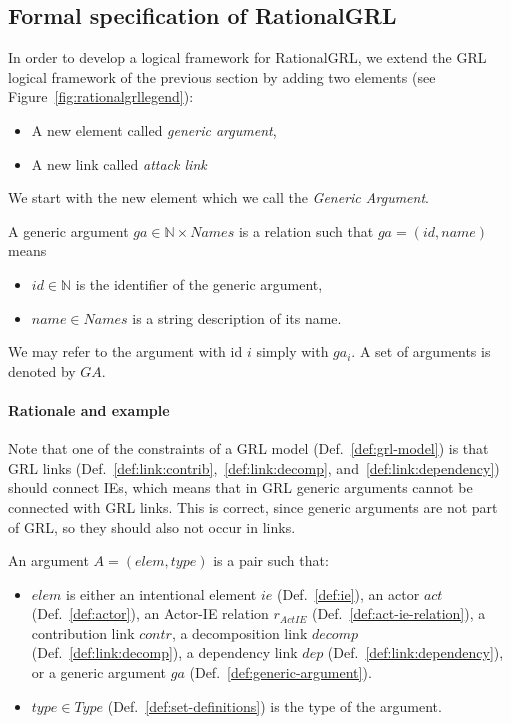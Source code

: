 \subsection{Formal specification of RationalGRL}
\label{sect:formalframework:rationalgrl}

In order to develop a logical framework for RationalGRL, we extend the GRL logical framework of the previous section by adding two elements (see Figure~\ref{fig:rationalgrllegend}):
\begin{itemize}
\item A new element called \emph{generic argument},
\item A new link called \emph{attack link}
\end{itemize}

We start with the new element which we call the \emph{Generic Argument}.

\begin{definition}
\label{def:generic-argument}
A generic argument $ga \in \mathbb{N}\times Names$ is a relation such that $ga=(id, name)$ means
\begin{itemize}
\item $id\in \mathbb{N}$ is the identifier of the generic argument,
\item $name\in Names$ is a string description of its name.
\end{itemize}
We may refer to the argument with id $i$ simply with $ga_i$. A set of arguments is denoted by $GA$.
\end{definition}

\paragraph{Rationale and example} 


Note that one of the constraints of a GRL model (Def.~\ref{def:grl-model}) is that GRL links (Def.~\ref{def:link:contrib},~\ref{def:link:decomp}, and~\ref{def:link:dependency}) should connect IEs, which means that in GRL generic arguments cannot be connected with GRL links. This is correct, since generic arguments are not part of GRL, so they should also not occur in links. 

\begin{definition}[Argument]
\label{def:argument}
An argument $A=(elem,type)$ is a pair such that:
\begin{itemize}
\item $elem$ is either an intentional element $ie$ (Def.~\ref{def:ie}), an actor $act$ (Def.~\ref{def:actor}), an Actor-IE relation $r_{ActIE}$ (Def.~\ref{def:act-ie-relation}),  a contribution link $contr$, a decomposition link $decomp$ (Def.~\ref{def:link:decomp}), a dependency link $dep$ (Def.~\ref{def:link:dependency}), or a generic argument $ga$ (Def.~\ref{def:generic-argument}).
\item $type\in Type$ (Def.~\ref{def:set-definitions}) is the type of the argument.
\end{itemize}
\end{definition}

